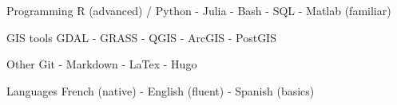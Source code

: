 \vspace{-15pt}


\begin{cvskills}

  \cvskill
    {Programming} %
    {R (advanced) / Python - Julia - Bash - SQL - Matlab (familiar)} %

  \cvskill
    {GIS tools} %
    {GDAL - GRASS - QGIS - ArcGIS - PostGIS} %

  \cvskill
    {Other} %
    {Git - Markdown - LaTex - Hugo} %

  \cvskill
    {Languages} %
    {French (native) - English (fluent) - Spanish (basics)} %

\end{cvskills}
